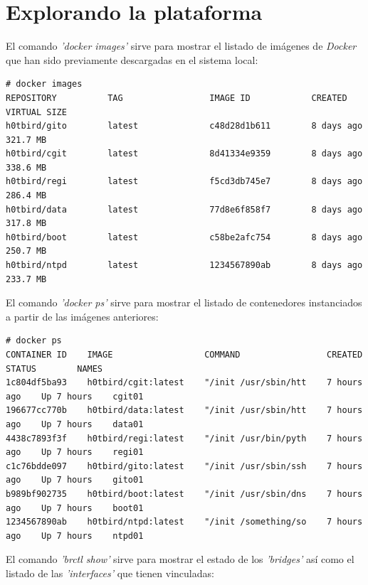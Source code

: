 \documentclass[a4paper,12pt,spanish,final]{epsc_tfc_pfc}
\begin{document}
\section{Explorando la plataforma}

El comando \emph{'docker images'} sirve para mostrar el listado de imágenes de \emph{Docker} que han sido previamente descargadas en el sistema local:\\

\begin{lstlisting}[style=dnsmasq]
# docker images
REPOSITORY          TAG                 IMAGE ID            CREATED             VIRTUAL SIZE
h0tbird/gito        latest              c48d28d1b611        8 days ago          321.7 MB
h0tbird/cgit        latest              8d41334e9359        8 days ago          338.6 MB
h0tbird/regi        latest              f5cd3db745e7        8 days ago          286.4 MB
h0tbird/data        latest              77d8e6f858f7        8 days ago          317.8 MB
h0tbird/boot        latest              c58be2afc754        8 days ago          250.7 MB
h0tbird/ntpd        latest              1234567890ab        8 days ago          233.7 MB
\end{lstlisting}

El comando \emph{'docker ps'} sirve para mostrar el listado de contenedores instanciados a partir de las imágenes anteriores:\\

\begin{lstlisting}[style=dnsmasq]
# docker ps
CONTAINER ID    IMAGE                  COMMAND                 CREATED        STATUS        NAMES
1c804df5ba93    h0tbird/cgit:latest    "/init /usr/sbin/htt    7 hours ago    Up 7 hours    cgit01
196677cc770b    h0tbird/data:latest    "/init /usr/sbin/htt    7 hours ago    Up 7 hours    data01
4438c7893f3f    h0tbird/regi:latest    "/init /usr/bin/pyth    7 hours ago    Up 7 hours    regi01
c1c76bdde097    h0tbird/gito:latest    "/init /usr/sbin/ssh    7 hours ago    Up 7 hours    gito01
b989bf902735    h0tbird/boot:latest    "/init /usr/sbin/dns    7 hours ago    Up 7 hours    boot01
1234567890ab    h0tbird/ntpd:latest    "/init /something/so    7 hours ago    Up 7 hours    ntpd01
\end{lstlisting}

El comando \emph{'brctl show'} sirve para mostrar el estado de los \emph{'bridges'} así como el listado de las \emph{'interfaces'} que tienen vinculadas:\\
\end{document}

